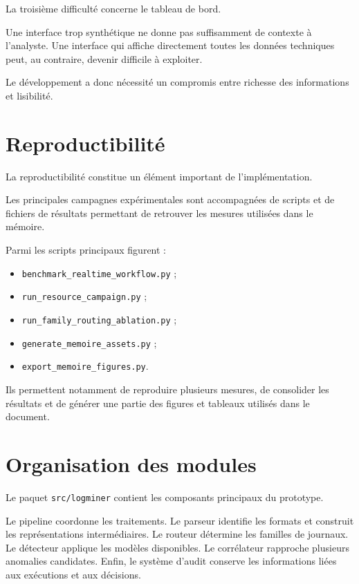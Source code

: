 La troisième difficulté concerne le tableau de bord.

Une interface trop synthétique ne donne pas suffisamment de contexte à l'analyste. Une interface qui affiche directement toutes les données techniques peut, au contraire, devenir difficile à exploiter.

Le développement a donc nécessité un compromis entre richesse des informations et lisibilité.

\section{Reproductibilité}

La reproductibilité constitue un élément important de l'implémentation.

Les principales campagnes expérimentales sont accompagnées de scripts et de fichiers de résultats permettant de retrouver les mesures utilisées dans le mémoire.

Parmi les scripts principaux figurent :

\begin{itemize}

\item \texttt{benchmark\_realtime\_workflow.py} ;

\item \texttt{run\_resource\_campaign.py} ;

\item \texttt{run\_family\_routing\_ablation.py} ;

\item \texttt{generate\_memoire\_assets.py} ;

\item \texttt{export\_memoire\_figures.py}.

\end{itemize}

Ils permettent notamment de reproduire plusieurs mesures, de consolider les résultats et de générer une partie des figures et tableaux utilisés dans le document.

\section{Organisation des modules}

Le paquet \texttt{src/logminer} contient les composants principaux du prototype.

Le pipeline coordonne les traitements. Le parseur identifie les formats et construit les représentations intermédiaires. Le routeur détermine les familles de journaux. Le détecteur applique les modèles disponibles. Le corrélateur rapproche plusieurs anomalies candidates. Enfin, le système d'audit conserve les informations liées aux exécutions et aux décisions.

